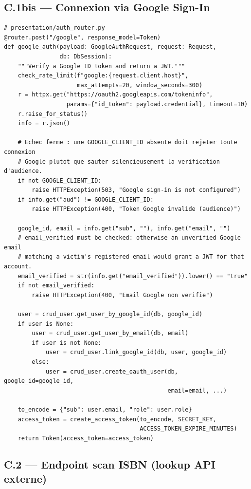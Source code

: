 \documentclass[12pt, a4paper]{report}
\renewcommand{\_}{\origunderscore\allowbreak}
\begin{document}
\subsection*{C.1bis — Connexion via Google Sign-In}

\begin{lstlisting}[style=pythonstyle, caption={Endpoint POST /auth/google — vérification du jeton et liaison de compte}, label={lst:google-auth}]
# presentation/auth_router.py
@router.post("/google", response_model=Token)
def google_auth(payload: GoogleAuthRequest, request: Request,
                db: DbSession):
    """Verify a Google ID token and return a JWT."""
    check_rate_limit(f"google:{request.client.host}",
                     max_attempts=20, window_seconds=300)
    r = httpx.get("https://oauth2.googleapis.com/tokeninfo",
                  params={"id_token": payload.credential}, timeout=10)
    r.raise_for_status()
    info = r.json()

    # Echec ferme : une GOOGLE_CLIENT_ID absente doit rejeter toute connexion
    # Google plutot que sauter silencieusement la verification d'audience.
    if not GOOGLE_CLIENT_ID:
        raise HTTPException(503, "Google sign-in is not configured")
    if info.get("aud") != GOOGLE_CLIENT_ID:
        raise HTTPException(400, "Token Google invalide (audience)")

    google_id, email = info.get("sub", ""), info.get("email", "")
    # email_verified must be checked: otherwise an unverified Google email
    # matching a victim's registered email would grant a JWT for that account.
    email_verified = str(info.get("email_verified")).lower() == "true"
    if not email_verified:
        raise HTTPException(400, "Email Google non verifie")

    user = crud_user.get_user_by_google_id(db, google_id)
    if user is None:
        user = crud_user.get_user_by_email(db, email)
        if user is not None:
            user = crud_user.link_google_id(db, user, google_id)
        else:
            user = crud_user.create_oauth_user(db, google_id=google_id,
                                               email=email, ...)

    to_encode = {"sub": user.email, "role": user.role}
    access_token = create_access_token(to_encode, SECRET_KEY,
                                       ACCESS_TOKEN_EXPIRE_MINUTES)
    return Token(access_token=access_token)
\end{lstlisting}

\subsection*{C.2 — Endpoint scan ISBN (lookup API externe)}
\end{document}
